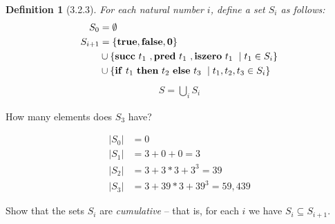 \documentclass[12pt,letterpaper,boxed]{hmcpset}
\newtheorem{definition}{Definition}[section]
\newcommand{\f}[2]{\textnormal{\textbf{#1}}\ #2\ }
\newcommand{\val}[1]{\textnormal{\textbf{#1}}}
\begin{document}
\problemlist{}

\begin{definition}[3.2.3]
    For each natural number $i$, define a set $S_i$ as follows:
    \begin{align*}
        S_0 &= \emptyset \\
        S_{i+1} &= \{\val{true}, \val{false}, \val{0}\} \\
                &\cup \{\f{succ}{t_1}, \f{pred}{t_1}, \f{iszero}{t_1} \mid t_1 \in S_i \} \\
                &\cup \{\f{if}{t_1} \f{then}{t_2} \f{else}{t_3} \mid t_1, t_2, t_3 \in S_i\}
    \end{align*}
    \begin{align*}
        S = \bigcup_i S_i
    \end{align*}
\end{definition}

\begin{problem}[3.2.4]
How many elements does $S_3$ have?
\end{problem}

\begin{solution}
    \begin{align*}
        |S_0| &= 0 \\
        |S_1| &= 3 + 0 + 0 = 3 \\
        |S_2| &= 3 + 3*3 + 3^3 = 39 \\
        |S_3| &= 3 + 39*3 + 39^3 = 59,439 
    \end{align*}
\end{solution}

\begin{problem}[3.2.5]
Show that the sets $S_i$ are \emph{cumulative} -- that is, for each $i$ we have $S_i \subseteq S_{i+1}$.
\end{problem}

\begin{solution}
    
\end{solution}
\end{document}
